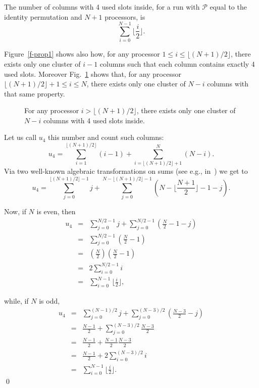 \documentclass{elsart}
\newcommand{\floor}[1]{{\lfloor{#1}\rfloor}}
\begin{document}
\begin{lem}\label{4slot.clusters}
The number of columns with 4 used slots inside, for a run with $\mathcal P$ equal to the identity 
permutation and $N+1$ processors, is
\begin{equation}
\sum_{i=0}^{N-1} \floor{\frac{i}{2}}.
\end{equation}
\end{lem}
\begin{pf}
Figure~\ref{f-prop1} shows also how, for any processor $1\leq i\leq\floor{(N+1)/2}$, there exists
only one cluster of $i-1$ columns such that each column contains exactly 4 used slots.
Moreover Fig.~\ref{f-prop2} shows that, for any processor $\floor{(N+1)/2}+1\leq i\leq N$, there exists
only one cluster of $N-i$ columns with that same property.

\begin{figure}[h]
\centerline{}
\caption{For any processor $i>\floor{(N+1)/2}$, there exists only one
cluster of $N-i$ columns with 4 used slots inside.}
\label{f-prop2}
\end{figure}

Let us call $u_4$ this number and count such columns:
\begin{equation}
u_4 = \sum_{i=1}^{\floor{(N+1)/2}} (i-1) + \sum_{i=\floor{(N+1)/2}+1}^N (N-i).
\end{equation}
Via two well-known algebraic transformations on sums (see
e.g., in~\cite{GrKn86,PuBr85})
we get to
\begin{equation}
u_4 = \sum_{j=0}^{\floor{(N+1)/2}-1} j + \sum_{j=0}^{N-\floor{(N+1)/2}-1} (N-\floor{\frac{N+1}2}-1-j).
\end{equation}

Now, if $N$ is even, then
\begin{eqnarray}
u_4 &=& \sum_{j=0}^{N/2-1} j + \sum_{j=0}^{N/2-1} (\frac{N}2-1-j) \nonumber\\
    &=& \sum_{j=0}^{N/2-1} (\frac{N}2-1) \nonumber\\
    &=& (\frac{N}2)(\frac{N}2-1) \label{even.quadratic} \\ &=& 2\sum_{i=0}^{N/2-1} i \nonumber\\
    &=& \sum_{i=0}^{N-1} \floor{\frac{i}2},\nonumber
\end{eqnarray}

\noindent
while, if $N$ is odd,
\begin{eqnarray}
u_4 &=& \sum_{j=0}^{(N-1)/2} j + \sum_{j=0}^{(N-3)/2} (\frac{N-3}2-j) \nonumber\\
    &=& \frac{N-1}2 + \sum_{j=0}^{(N-3)/2} \frac{N-3}2 \nonumber\\
    &=& \frac{N-1}2 + \frac{N-1}2 \frac{N-3}2 \label{odd.quadratic} \\ &=& \frac{N-1}2 + 2\sum_{i=0}^{(N-3)/2} i \nonumber\\
    &=& \sum_{i=0}^{N-1} \floor{\frac{i}2}.\nonumber
\end{eqnarray}
\qed
\end{pf}
\end{document}
